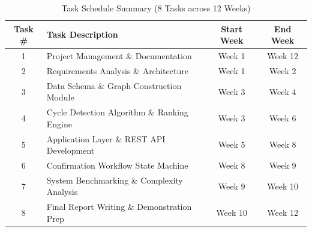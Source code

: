 \begin{table}[h!]
\caption{Task Schedule Summary (8 Tasks across 12 Weeks)}
\vspace{6pt}
\centering
\begin{tabularx}{\textwidth}{|c|X|c|c|}
\hline
\textbf{Task \#} & \textbf{Task Description} & \textbf{Start Week} & \textbf{End Week} \\
\hline
1 & Project Management \& Documentation & Week 1 & Week 12 \\
2 & Requirements Analysis \& Architecture & Week 1 & Week 2 \\
3 & Data Schema \& Graph Construction Module & Week 3 & Week 4 \\
4 & Cycle Detection Algorithm \& Ranking Engine & Week 3 & Week 6 \\
5 & Application Layer \& REST API Development & Week 5 & Week 8 \\
6 & Confirmation Workflow State Machine & Week 8 & Week 9 \\
7 & System Benchmarking \& Complexity Analysis & Week 9 & Week 10 \\
8 & Final Report Writing \& Demonstration Prep & Week 10 & Week 12 \\
\hline
\end{tabularx}
\end{table}